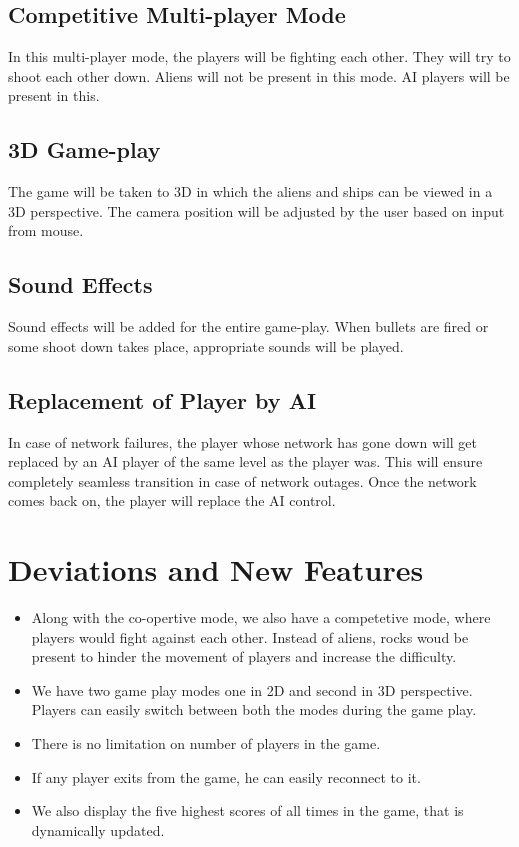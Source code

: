 \documentclass{article}
\begin{document}
		\subsection{Competitive Multi-player Mode}
			In this multi-player mode, the players will be fighting each other. They will try to shoot each other down. Aliens will not be present in this mode. AI players will be present in this.
		\subsection{3D Game-play}
			The game will be taken to 3D in which the aliens and ships can be viewed in a 3D perspective. The camera position will be adjusted by the user based on input from mouse.
		\subsection{Sound Effects}
			Sound effects will be added for the entire game-play. When bullets are fired or some shoot down takes place, appropriate sounds will be played.
		\subsection{Replacement of Player by AI}
			In case of network failures, the player whose network has gone down will get replaced by an AI player of the same level as the player was. This will ensure completely seamless transition in case of network outages. Once the network comes back on, the player will replace the AI control.

	\section{Deviations and New Features}
		\begin{itemize} 
		\item Along with the co-opertive mode, we also have a competetive mode, where players would fight against each other. Instead of aliens, rocks woud be present to hinder the movement of players and increase the difficulty. 
		\item  We have two game play modes one in 2D and second in 3D perspective. Players can easily switch between both the modes during the game play.
		\item There is no limitation on number of players in the game. 
		\item If any player exits from the game, he can easily reconnect to it.
		\item We also display the five highest scores of all times in the game, that is dynamically updated.  
		\end{itemize}   
\end{document}
